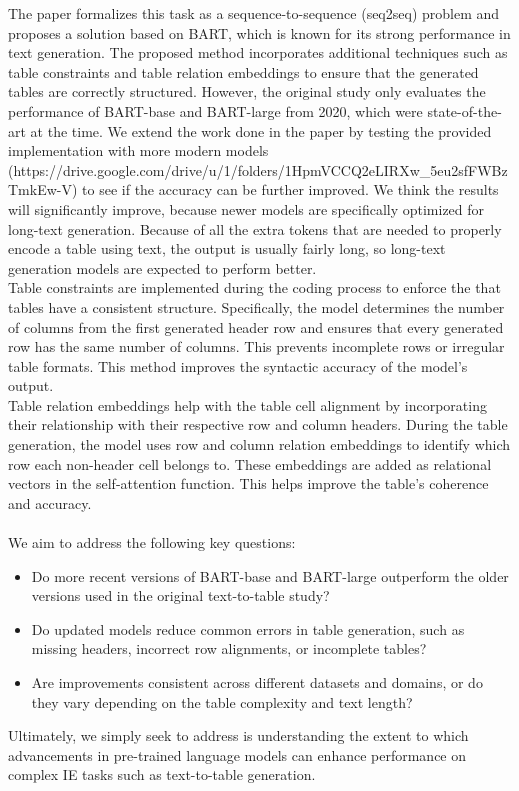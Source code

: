 \documentclass[12pt,a4paper]{article}
\begin{document}
The paper formalizes this task as a sequence-to-sequence (seq2seq) problem and proposes a solution based on BART, which is known for its strong performance in text generation. The proposed method incorporates additional techniques such as table constraints and table relation embeddings to ensure that the generated tables are correctly structured. However, the original study only evaluates the performance of BART-base and BART-large from 2020, which were state-of-the-art at the time. We extend the work done in the paper by testing the provided implementation with more modern models (https://drive.google.com/drive/u/1/folders/1HpmVCCQ2eLIRXw_5eu2sfFWBzTmkEw-V) to see if the accuracy can be further improved. We think the results will significantly improve, because newer models are specifically optimized for long-text generation. Because of all the extra tokens that are needed to properly encode a table using text, the output is usually fairly long, so long-text generation models are expected to perform better.
\ \\

Table constraints are implemented during the coding process to enforce the that tables have a consistent structure. Specifically, the model determines the number of columns from the first generated header row and ensures that every generated row has the same number of columns. This prevents incomplete rows or irregular table formats. This method improves the syntactic accuracy of the model's output.
\ \\

Table relation embeddings help with the table cell alignment by incorporating their relationship with their respective row and column headers. During the table generation, the model uses row and column relation embeddings to identify which row each non-header cell belongs to. These embeddings are added as relational vectors in the self-attention function. This helps improve the table's coherence and accuracy. 
\ \\\\
We aim to address the following key questions:
\begin{itemize}
    \item Do more recent versions of BART-base and BART-large outperform the older versions used in the original text-to-table study?

    \item Do updated models reduce common errors in table generation, such as missing headers, incorrect row alignments, or incomplete tables?

    \item Are improvements consistent across different datasets and domains, or do they vary depending on the table complexity and text length?
\end{itemize}
Ultimately, we simply seek to address is understanding the extent to which advancements in pre-trained language models can enhance performance on complex IE tasks such as text-to-table generation. 
\end{document}

